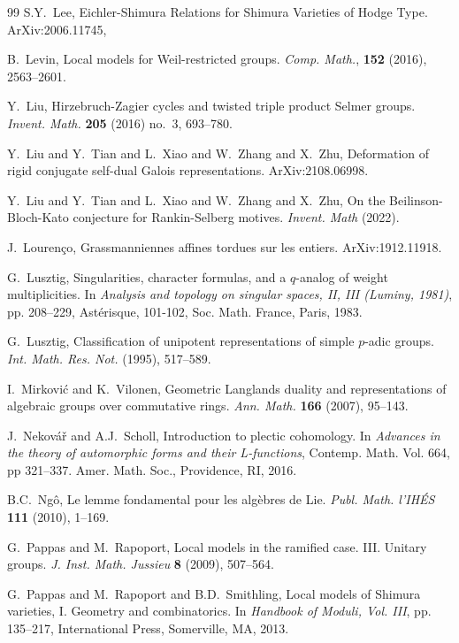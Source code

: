 \documentclass[11pt]{amsart}
\theoremstyle{definition}
\theoremstyle{definition}
\theoremstyle{definition}
\numberwithin{equation}{section}
\begin{document}
\begin{thebibliography}{99}
S.Y.~Lee, Eichler-Shimura Relations for Shimura Varieties of Hodge Type. ArXiv:2006.11745,

B.~Levin, Local models for Weil-restricted groups. \emph{Comp. Math.}, \textbf{152} (2016), 2563--2601. 

Y.~Liu, Hirzebruch-Zagier cycles and twisted triple product Selmer groups. \emph{Invent. Math.} \textbf{205} (2016) no.~3, 693--780.

Y.~Liu and Y.~Tian and L.~Xiao and W.~Zhang and X.~Zhu, Deformation of rigid conjugate self-dual Galois representations. ArXiv:2108.06998.

Y.~Liu and Y.~Tian and L.~Xiao and W.~Zhang and X.~Zhu, On the Beilinson-Bloch-Kato conjecture for Rankin-Selberg motives. \emph{Invent. Math} (2022).

J.~Louren\c{c}o, Grassmanniennes affines tordues sur les entiers. ArXiv:1912.11918.

G.~Lusztig, Singularities, character formulas, and a $q$-analog of weight multiplicities. In \emph{Analysis and topology on singular spaces, II, III (Luminy, 1981)}, pp. 208--229, Ast\'erisque, 101-102, Soc. Math. France, Paris, 1983.


G.~Lusztig, Classification of unipotent representations of simple $p$-adic groups. \emph{Int. Math. Res. Not.} (1995), 517--589.

I.~Mirkovi\'c and K.~Vilonen, Geometric Langlands duality and representations of algebraic groups over commutative rings. \emph{Ann. Math.} \textbf{166} (2007), 95--143.

J.~Nekov\'a\v{r} and A.J.~Scholl, Introduction to plectic cohomology. In \emph{Advances in the theory of automorphic forms and their L-functions}, Contemp. Math. Vol. 664, pp 321--337. Amer. Math. Soc., Providence, RI, 2016.

B.C.~Ng\^o, Le lemme fondamental pour les alg\`ebres de Lie. \emph{Publ. Math. l'IH\'ES} \textbf{111} (2010), 1--169.

G.~Pappas and M.~Rapoport, Local models in the ramified case. III. Unitary groups.  \emph{J. Inst. Math. Jussieu} \textbf{8} (2009), 507--564.

G.~Pappas and M.~Rapoport and B.D.~Smithling, Local models of Shimura varieties, I. Geometry and combinatorics. In \emph{Handbook of Moduli, Vol. III}, pp. 135--217, International Press, Somerville, MA, 2013.


\end{thebibliography}
\end{document}
